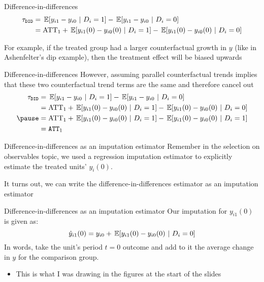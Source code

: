 \documentclass[aspectratio=169,t,11pt,table]{beamer}
\begin{document}
\begin{frame}{Difference-in-differences}
  \vspace*{-\bigskipamount}
  \begin{align*}
    \tau_{\texttt{DID}} &= \expec{y_{i1} - y_{i0}}{D_i = 1} - \expec{y_{i1} - y_{i0}}{D_i = 0}  \\ 
    &= \text{ATT}_1 + \expec{y_{i1}(0) - y_{i0}(0)}{D_i = 1} - \expec{y_{i1}(0) - y_{i0}(0)}{D_i = 0}
  \end{align*}

  \medskip
  For example, if the treated group had a larger counterfactual growth in $y$ (like in Ashenfelter's dip example), then the treatment effect will be biased upwards
\end{frame}

\begin{frame}{Difference-in-differences}
  However, assuming parallel counterfactual trends implies that these two counterfactual trend terms are the same and therefore cancel out
  \begin{align*}
    \tau_{\texttt{DID}} &= \expec{y_{i1} - y_{i0}}{D_i = 1} - \expec{y_{i1} - y_{i0}}{D_i = 0}  \\ 
    &= \text{ATT}_1 + \expec{y_{i1}(0) - y_{i0}(0)}{D_i = 1} - \expec{y_{i1}(0) - y_{i0}(0)}{D_i = 0} \\ 
    \pause
    &= \text{ATT}_1 + \expec{y_{i1}(0) - y_{i0}(0)}{D_i = 1} - \expec{y_{i1}(0) - y_{i0}(0)}{D_i = 1} \\
    &= \texttt{ATT}_1
  \end{align*}
\end{frame}

\begin{frame}{Difference-in-differences as an imputation estimator}
  Remember in the selection on observables topic, we used a regression imputation estimator to explicitly estimate the treated units' $y_i(0)$.

  \bigskip
  It turns out, we can write the difference-in-differences estimator as an imputation estimator
\end{frame}

\begin{frame}{Difference-in-differences as an imputation estimator}
  Our imputation for $y_{i1}(0)$ is given as:
  $$
    \hat{y}_{i1}(0) = y_{i0} + \expec{y_{i1}(0) - y_{i0}(0)}{D_i = 0}
  $$
  In words, take the unit's period $t = 0$ outcome and add to it the average change in $y$ for the comparison group.
  \begin{itemize}
    \item This is what I was drawing in the figures at the start of the slides
  \end{itemize}
\end{frame}
\end{document}
